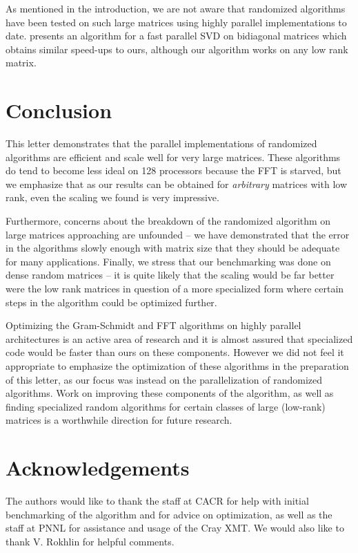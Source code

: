 \documentclass[11pt]{article}
\begin{document}
As mentioned in the introduction, we are not aware that randomized algorithms have been tested on such large matrices using highly parallel implementations to date.   \cite{konda} presents an algorithm for a fast parallel SVD on bidiagonal matrices which obtains similar speed-ups to ours, although our algorithm works on any low rank matrix.

\section{Conclusion}
This letter demonstrates that the parallel implementations of randomized algorithms are efficient and scale well for very large matrices.  These algorithms do tend to become less ideal on 128 processors because the FFT is starved, but we emphasize that as our results can be obtained for \emph{arbitrary} matrices with low rank, even the scaling we found is very impressive.  

Furthermore, concerns about the breakdown of the randomized algorithm on large matrices approaching are unfounded -- we have demonstrated that the error in the algorithms slowly enough with matrix size that they should be adequate for many applications.  Finally, we stress that our benchmarking was done on dense random matrices -- it is quite likely that the scaling would be far better were the low rank matrices in question of a more specialized form where certain steps in the algorithm could be optimized further.

Optimizing the Gram-Schmidt and FFT algorithms on highly parallel architectures is an active area of research and it is almost assured that specialized code would be  faster than ours on these components.  However we did not feel it appropriate to emphasize the optimization of these algorithms in the preparation of this letter, as our focus was instead on the parallelization of randomized algorithms.  Work on improving these components of the algorithm, as well as finding specialized random algorithms for certain classes of large (low-rank) matrices is a worthwhile direction for future research.

\section*{Acknowledgements}
The authors would like to thank the staff at CACR for help with initial benchmarking of the algorithm and for advice on optimization, as well as the staff at PNNL for assistance and usage of the Cray XMT.   We would also like to thank V. Rokhlin for helpful comments.



\end{document}
